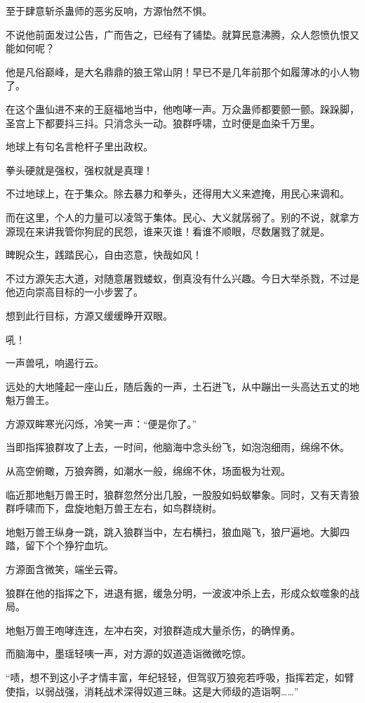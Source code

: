 \begin{this_body}
至于肆意斩杀蛊师的恶劣反响，方源怡然不惧。

不说他前面发过公告，广而告之，已经有了铺垫。就算民意沸腾，众人怨愤仇恨又能如何呢？

他是凡俗巅峰，是大名鼎鼎的狼王常山阴！早已不是几年前那个如履薄冰的小人物了。

在这个蛊仙进不来的王庭福地当中，他咆哮一声。万众蛊师都要颤一颤。跺跺脚，圣宫上下都要抖三抖。只消念头一动。狼群呼啸，立时便是血染千万里。

地球上有句名言枪杆子里出政权。

拳头硬就是强权，强权就是真理！

不过地球上，在于集众。除去暴力和拳头，还得用大义来遮掩，用民心来调和。

而在这里，个人的力量可以凌驾于集体。民心、大义就孱弱了。别的不说，就拿方源现在来讲我管你狗屁的民怨，谁来灭谁！看谁不顺眼，尽数屠戮了就是。

睥睨众生，践踏民心，自由恣意，快哉如风！

不过方源矢志大道，对随意屠戮蝼蚁，倒真没有什么兴趣。今日大举杀戮，不过是他迈向崇高目标的一小步罢了。

想到此行目标，方源又缓缓睁开双眼。

吼！

一声兽吼，响遏行云。

远处的大地隆起一座山丘，随后轰的一声，土石迸飞，从中蹦出一头高达五丈的地魁万兽王。

方源双眸寒光闪烁，冷笑一声：“便是你了。”

当即指挥狼群攻了上去，一时间，他脑海中念头纷飞，如泡泡细雨，绵绵不休。

从高空俯瞰，万狼奔腾，如潮水一般，绵绵不休，场面极为壮观。

临近那地魁万兽王时，狼群忽然分出几股，一股股如蚂蚁攀象。同时，又有天青狼群呼啸而下，盘旋地魁万兽王左右，如鸟群绕树。

地魁万兽王纵身一跳，跳入狼群当中，左右横扫，狼血飚飞，狼尸遍地。大脚四踏，留下个个狰狞血坑。

方源面含微笑，端坐云霄。

狼群在他的指挥之下，进退有据，缓急分明，一波波冲杀上去，形成众蚁噬象的战局。

地魁万兽王咆哮连连，左冲右突，对狼群造成大量杀伤，的确悍勇。

而脑海中，墨瑶轻咦一声，对方源的奴道造诣微微吃惊。

“啧，想不到这小子才情丰富，年纪轻轻，但驾驭万狼宛若呼吸，指挥若定，如臂使指，以弱战强，消耗战术深得奴道三昧。这是大师级的造诣啊……”


\end{this_body}
